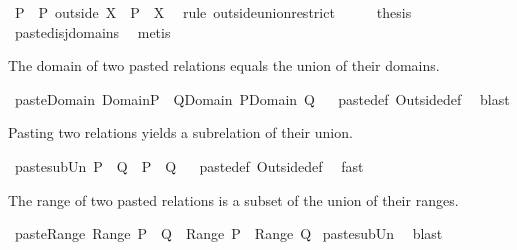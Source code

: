 \begin{isabellebody}
\ {\isachardoublequoteopen}P\ {\isacharequal}\ P\ outside\ X\ {\isasymunion}\ P\ {\isacharbar}{\isacharbar}\ X{\isachardoublequoteclose}\ \isamarkupfalse%
\ {\isacharparenleft}rule\ outside{\isacharunderscore}union{\isacharunderscore}restrict{\isacharparenright}\isanewline
\ \ \isamarkupfalse%
\ \isamarkupfalse%
\ {\isacharquery}thesis\ \isamarkupfalse%
\ paste{\isacharunderscore}disj{\isacharunderscore}domains\ \isamarkupfalse%
\ metis\isanewline
{}\isamarkupfalse%
%
\endisatagproof
{\isafoldproof}%
%
\isadelimproof
%
\endisadelimproof
%
\begin{isamarkuptext}%
The domain of two pasted relations equals the union of their domains.%
\end{isamarkuptext}%
\isamarkuptrue%
\isamarkupfalse%
\ paste{\isacharunderscore}Domain{\isacharcolon}\ {\isachardoublequoteopen}Domain{\isacharparenleft}P\ {\isacharplus}{\isacharasterisk}\ Q{\isacharparenright}{\isacharequal}Domain\ P{\isasymunion}Domain\ Q{\isachardoublequoteclose}%
\isadelimproof
\ %
\endisadelimproof
%
\isatagproof
{}\isamarkupfalse%
\ paste{\isacharunderscore}def\ Outside{\isacharunderscore}def\ \isamarkupfalse%
\ blast%
\endisatagproof
{\isafoldproof}%
%
\isadelimproof
%
\endisadelimproof
%
\begin{isamarkuptext}%
Pasting two relations yields a subrelation of their union.%
\end{isamarkuptext}%
\isamarkuptrue%
\isamarkupfalse%
\ paste{\isacharunderscore}sub{\isacharunderscore}Un{\isacharcolon}\ {\isachardoublequoteopen}P\ {\isacharplus}{\isacharasterisk}\ Q\ {\isasymsubseteq}\ P\ {\isasymunion}\ Q{\isachardoublequoteclose}%
\isadelimproof
\ %
\endisadelimproof
%
\isatagproof
{}\isamarkupfalse%
\ paste{\isacharunderscore}def\ Outside{\isacharunderscore}def\ \isamarkupfalse%
\ fast%
\endisatagproof
{\isafoldproof}%
%
\isadelimproof
%
\endisadelimproof
%
\begin{isamarkuptext}%
The range of two pasted relations is a subset of the union of their ranges.%
\end{isamarkuptext}%
\isamarkuptrue%
\isamarkupfalse%
\ paste{\isacharunderscore}Range{\isacharcolon}\ {\isachardoublequoteopen}Range\ {\isacharparenleft}P\ {\isacharplus}{\isacharasterisk}\ Q{\isacharparenright}\ {\isasymsubseteq}\ Range\ P\ {\isasymunion}\ Range\ Q{\isachardoublequoteclose}\isanewline
%
\isadelimproof
\isanewline
%
\endisadelimproof
%
\isatagproof
{}\isamarkupfalse%
\ paste{\isacharunderscore}sub{\isacharunderscore}Un\ \isamarkupfalse%
\ blast%
\endisatagproof
{\isafoldproof}%
%
\isadelimproof
\isanewline
%
\endisadelimproof
%
\isadelimtheory
\isanewline
%
\endisadelimtheory
%
\isatagtheory
{}\isamarkupfalse%
%
\endisatagtheory
{\isafoldtheory}%
%
\isadelimtheory
%
\endisadelimtheory
\end{isabellebody}%
